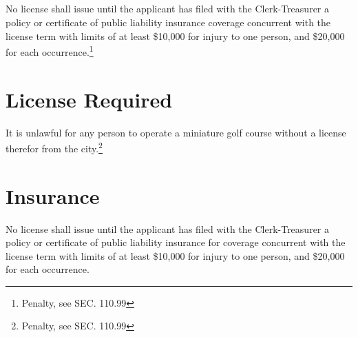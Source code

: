 \subsection{}
No license shall issue until the applicant has filed with the Clerk-Treasurer a policy or certificate of public liability insurance coverage concurrent with the license term with limits of at least \$10,000 for injury to one person, and \$20,000 for each occurrence.\footnote{Penalty, see SEC. 110.99}\\


\setcounter{section}{74}
\section{License Required}
It is unlawful for any person to operate a miniature golf course without a license therefor from the city.\footnote{Penalty, see SEC. 110.99}

\section{Insurance}
No license shall issue until the applicant has filed with the Clerk-Treasurer a policy or certificate of public liability insurance for coverage concurrent with the license term with limits of at least \$10,000 for injury to one person, and \$20,000 for each occurrence.

